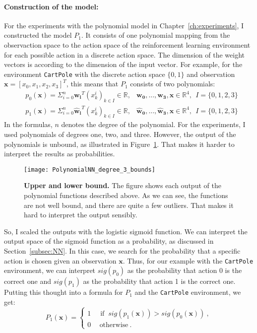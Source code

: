 \paragraph*{Construction of the model:} For the experiments with the polynomial model in Chapter~\ref{ch:experiments}, I constructed the model $P_1$. It consists of one polynomial mapping from the observaction space to the action space of the reinforcement learning environment for each possible action in a discrete action space. The dimension of the weight vectors is according to the dimension of the input vector. For example, for the environment \verb|CartPole| with the discrete action space $\{0, 1\}$ and observation $\mathbf{x} = [x_0, x_1, x_2, x_3]^T$, this means that $P_1$ consists of two polynomials:
\begin{align*}
  &p_0(\mathbf{x}) = \Sigma_{i=0}^{n} \mathbf{w_i}^T (x_k^i)_{k \in I} \in \mathbb{R}, &\mathbf{w_0}, ..., \mathbf{w_3}, \mathbf{x} \in \mathbb{R}^4, \ \ I = \{0, 1, 2, 3\} \\
  &p_1(\mathbf{x}) = \Sigma_{i=0}^{n} \mathbf{\hat{w}_i}^T (x_k^i)_{k \in I} \in \mathbb{R}, &\mathbf{\hat{w}_0}, ..., \mathbf{\hat{w}_3}, \mathbf{x} \in \mathbb{R}^4, \ \ I = \{0, 1, 2, 3\}
\end{align*}
In the formulas, $n$ denotes the degree of the polynomial. For the experiments, I used polynomials of degrees one, two, and three. However, the output of the polynomials is unbound, as illustrated in Figure~\ref{fig:bounds}. That makes it harder to interpret the results as probabilities.
\begin{figure}[ht]
\centering
\texttt{[image: PolynomialNN\_degree\_3\_bounds]}
\caption[Upper and lower bound]{
  \textbf{Upper and lower bound.}
  The figure shows each output of the polynomial functions described above. As we can see, the functions are not well bound, and there are quite a few outliers. That makes it hard to interpret the output sensibly.
}
\label{fig:bounds}
\end{figure}
So, I scaled the outputs with the logistic sigmoid function. We can interpret the output space of the sigmoid function as a probability, as discussed in Section~\ref{subsec:NN}. In this case, we search for the probability that a specific action is chosen given an observation $\mathbf{x}$. Thus, for our example with the \verb|CartPole| environment, we can interpret $sig(p_0)$ as the probability that action 0 is the correct one and $sig(p_1)$ as the probability that action 1 is the correct one. Putting this thought into a formula for $P_1$ and the \verb|CartPole| environment, we get:
\[
  P_1(\mathbf{x}) =
  \begin{cases}1~&{\text{ if }}~sig(p_1(\mathbf{x})) > sig(p_0(\mathbf{x}))~,\\0~&~\text{otherwise}~.\end{cases}
\]

